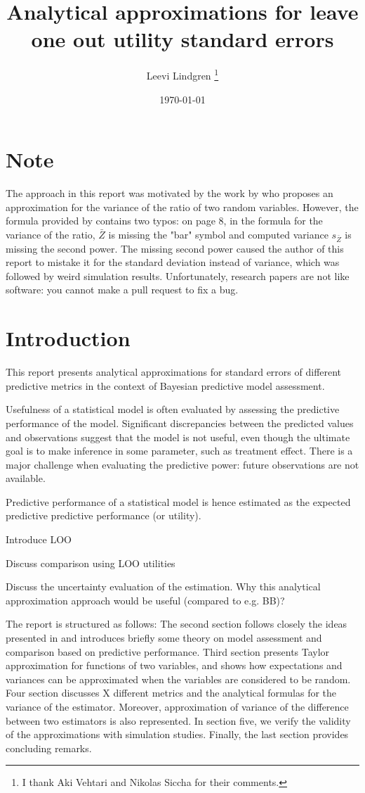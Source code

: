 \documentclass{article}
\title{Analytical approximations for leave one out utility standard errors}
\author{Leevi Lindgren \footnote{I thank Aki Vehtari and Nikolas Siccha for their comments.}}
\date{\today}
\begin{document}
\maketitle

\clearpage
\section*{Note}
The approach in this report was motivated by the work by \cite{hastings1970monte} who proposes an approximation for the variance of the ratio of two random variables. However, the formula provided by \cite{hastings1970monte} contains two typos: on page 8, in the formula for the variance of the ratio, $\bar{Z}$ is missing the "bar" symbol and computed variance $s_{\bar{Z}}$ is missing the second power. The missing second power caused the author of this report to mistake it for the standard deviation instead of variance, which was followed by weird simulation results. Unfortunately, research papers are not like software: you cannot make a pull request to fix a bug.
\clearpage

\tableofcontents
\clearpage
\section{Introduction}

This report presents analytical approximations for standard errors of different predictive metrics in the context of Bayesian predictive model assessment. 

Usefulness of a statistical model is often evaluated by assessing the predictive performance of the model. Significant discrepancies between the predicted values and observations suggest that the model is not useful, even though the ultimate goal is to make inference in some parameter, such as treatment effect. There is a major challenge when evaluating the predictive power: future observations are not available.

Predictive performance of a statistical model is hence estimated as the expected predictive predictive performance (or utility). 

Introduce LOO

Discuss comparison using LOO utilities

Discuss the uncertainty evaluation of the estimation. Why this analytical approximation approach would be useful (compared to e.g. BB)?

The report is structured as follows: The second section follows closely the ideas presented in \cite{vehtari_survey_2012} and introduces briefly some theory on model assessment and comparison based on predictive performance. Third section presents Taylor approximation for functions of two variables, and shows how expectations and variances can be approximated when the variables are considered to be random. Four section discusses X different metrics and the analytical formulas for the variance of the estimator. Moreover, approximation of variance of the difference between two estimators is also represented. In section five, we verify the validity of the approximations with simulation studies. Finally, the last section provides concluding remarks.
\end{document}
